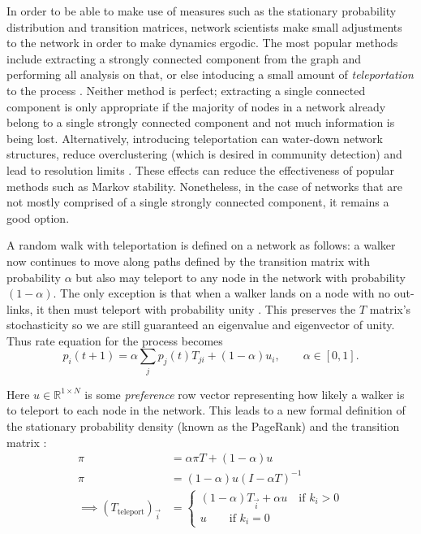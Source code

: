 \documentclass[12pt,a4paper]{article}
\begin{document}
\noindent In order to be able to make use of measures such as the stationary probability distribution and transition matrices, network scientists make small adjustments to the network in order to make dynamics ergodic. The most popular methods include extracting a strongly connected component from the graph \cite{salnikov2016} and performing all analysis on that, or else intoducing a small amount of \textit{teleportation} to the process \cite{salnikov2016,lambiottenotes,lambiotte2012ranking}. Neither method is perfect; extracting a single connected component is only appropriate if the majority of nodes in a network already belong to a single strongly connected component and not much information is being lost. Alternatively, introducing teleportation can water-down network structures, reduce overclustering (which is desired in community detection) and lead to resolution limits \cite{schaub2019multiscale}. These effects can reduce the effectiveness of popular methods such as Markov stability. Nonetheless, in the case of networks that are not mostly comprised of a single strongly connected component, it remains a good option. \medskip

\noindent A random walk with teleportation is defined on a network as follows: a walker now continues to move along paths defined by the transition matrix with probability $\alpha$ but also may teleport to any node in the network with probability $(1-\alpha )$. The only exception is that when a walker lands on a node with no out-links, it then must teleport with probability unity \cite{lambiottenotes}. This preserves the $T$ matrix's stochasticity so we are still guaranteed an eigenvalue and eigenvector of unity. Thus rate equation for the process becomes
\begin{equation}
p_i(t+1) = \alpha \sum\limits_j p_j(t)T_{ji} + (1-\alpha)u_i, \qquad \alpha \in [0,1].
\end{equation}

\noindent Here $u\in\mathbb{R}^{1\times N}$ is some \textit{preference} row vector representing how likely a walker is to teleport to each node in the network. This leads to a new formal definition of the stationary probability density (known as the PageRank) and the transition matrix \cite{lambiottenotes}:
\begin{align}
  \pi &= \alpha \pi T +(1-\alpha)u \\ \pi &= (1-\alpha)u(I-\alpha T)^{-1} \\
\implies  (T_{\text{teleport}})_{\vec{i}} &= \begin{cases} (1-\alpha)T_{\vec{i}} + \alpha u \quad \text{if } k_i >0 \\ u \qquad \text{if } k_i =0 \end{cases}
\end{align}\label{eq:teleportation}
\end{document}
